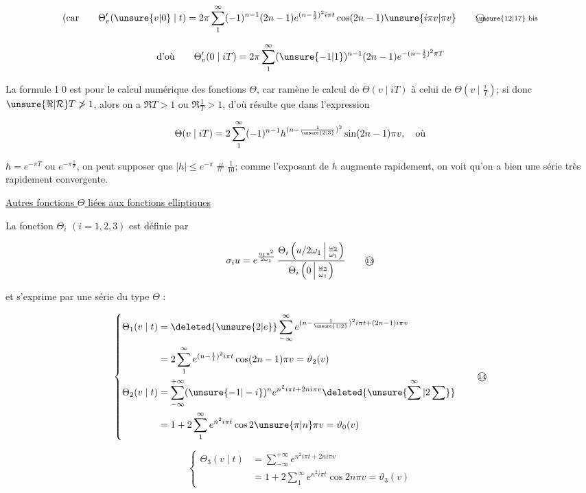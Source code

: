 \[
\text{(car}\qquad\Theta'_v(\unsure{v|0}\mid t)=2\pi\sum_1^\infty(-1)^{n-1}(2n-1)e^{(n-\frac12)^2i\pi t}\cos(2n-1)\unsure{i\pi v|\pi v}
\tag*{\textcircled{\scriptsize \unsure{12|17} bis}}
\]

\[
\text{d'où}\qquad\Theta'_v(0\mid iT)=2\pi\sum_1^\infty(\unsure{-1|1})^{n-1}(2n-1)e^{-(n-\frac12)^2\pi T}
\]

La formule \textcircled{\scriptsize 10} est  pour le calcul numérique des fonctions $\Theta$, car ramène le calcul de $\Theta(v\mid iT)$ à celui de $\Theta(v\mid\frac iT)$; si donc $\unsure{\Re|\mathcal R}T\ngtr1$, alors on a $\Re T>1$ ou $\Re\frac1T>1$, d'où résulte que dans l'expression

\[
\Theta(v\mid iT)=2\sum_1^\infty(-1)^{n-1}h^{(n-\frac1{\unsure{2|3}})^2}\sin(2n-1)\pi v,\quad\text{où}
\]

$h=e^{-\pi T}$ ou $e^{-\pi\frac1T}$, on peut supposer que $|h|\leq e^{-\pi}\mathrel{\#}\frac1{10}$; comme l'exposant de $h$ augmente rapidement, on voit qu'on a bien une série très rapidement convergente.

\uline{Autres fonctions $\Theta$ liées aux fonctions elliptiques}

La fonction $\Theta_i$ $(i=1,2,3)$ est définie par

\[
\sigma_i u=e^{\frac{\eta_1u^2}{2\omega_1}}\,
\frac{\Theta_i\left(u/2\omega_1\,\middle|\,\frac{\omega_2}{\omega_1}\right)}
{\Theta_i\left(0\,\middle|\,\frac{\omega_2}{\omega_1}\right)}
\tag*{\textcircled{\scriptsize 13}}
\]

et s'exprime par une série du type $\Theta$ :

\[
\left\{\begin{aligned}
\Theta_1(v\mid t)&=\deleted{\unsure{2|e}}\sum_{-\infty}^\infty e^{(n-\frac1{\unsure{1|2}})^2i\pi t+(2n-1)i\pi v}\\
&=2\sum_1^\infty e^{(n-\frac11)^2i\pi t}\cos(2n-1)\pi v=\vartheta_2(v)\\
\Theta_2(v\mid t)&=\sum_{-\infty}^{+\infty}(\unsure{-1|-i})^n e^{n^2i\pi t+2ni\pi v}\deleted{\unsure{\sum^{\infty}|2\sum}}\\
&=1+2\sum_1^\infty e^{n^2i\pi t}\cos2\unsure{\pi|n}\pi v=\vartheta_0(v)
\end{aligned}\right.
\tag*{\textcircled{\scriptsize 14}}
\]

\[
\left\{\begin{aligned}
\Theta_3(v\mid t)&=\sum_{-\infty}^{+\infty}e^{n^2i\pi t+2ni\pi v}\\
&=1+2\sum_1^\infty e^{n^2i\pi t}\cos2n\pi v=\vartheta_3(v)
\end{aligned}\right.
\]

